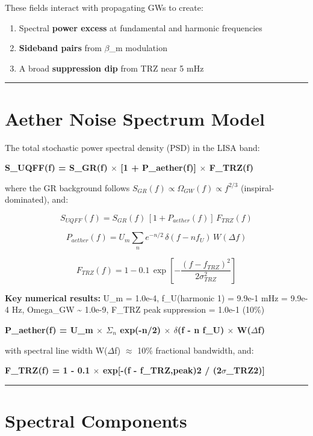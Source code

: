 \documentclass[12pt,a4paper]{article}
\begin{document}
These fields interact with propagating GWs to create:

\begin{enumerate}
  \item Spectral \textbf{power excess} at fundamental and harmonic frequencies
  \item \textbf{Sideband pairs} from $\beta$\_m modulation
  \item A broad \textbf{suppression dip} from TRZ near 5 mHz
\end{enumerate}

\medskip\hrule\medskip

\section{Aether Noise Spectrum Model}

The total stochastic power spectral density (PSD) in the LISA band:

\textbf{S\_UQFF(f) = S\_GR(f) $\times$ [1 + P\_aether(f)] $\times$ F\_TRZ(f)}

where the GR background follows $S_{GR}(f) \propto \Omega_{GW}(f) \propto f^{2/3}$ (inspiral-dominated), and:

\begin{equation}
S_{UQFF}(f) = S_{GR}(f)\,[1 + P_{aether}(f)]\,F_{TRZ}(f)
\end{equation}

\begin{equation}
P_{aether}(f) = U_m \sum_n e^{-n/2}\,\delta(f - n f_U)\,W(\Delta f)
\end{equation}

\begin{equation}
F_{TRZ}(f) = 1 - 0.1\,\exp\!\left[-\frac{(f-f_{TRZ})^2}{2\sigma_{TRZ}^2}\right]
\end{equation}

\textbf{Key numerical results:} U\_m = 1.0e-4, f\_U(harmonic 1) = 9.9e-1 mHz = 9.9e-4 Hz, Omega\_GW \textasciitilde{} 1.0e-9, F\_TRZ peak suppression = 1.0e-1 (10\%)

\textbf{P\_aether(f) = U\_m $\times$ $\Sigma$$_{n}$ exp(-n/2) $\times$ $\delta$(f - n f\_U) $\times$ W($\Delta$f)}

with spectral line width W($\Delta$f) $\approx$ 10\% fractional bandwidth, and:

\textbf{F\_TRZ(f) = 1 - 0.1 $\times$ exp[-(f - f\_TRZ,peak)2 / (2$\sigma$\_TRZ2)]}

\medskip\hrule\medskip

\section{Spectral Components}
\end{document}
